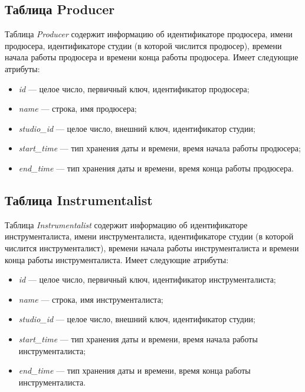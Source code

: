 \subsection{Таблица Producer}
Таблица \textit{Producer} содержит информацию об идентификаторе продюсера, имени продюсера, идентификаторе студии (в которой числится продюсер), времени начала работы продюсера и времени конца работы продюсера.
Имеет следующие атрибуты:
\begin{itemize}
	\item \textit{id} --- целое число, первичный ключ, идентификатор продюсера;
	\item \textit{name} --- строка, имя продюсера;
	\item \textit{studio\_id} --- целое число, внешний ключ, идентификатор студии;
	\item \textit{start\_time} --- тип хранения даты и времени, время начала работы продюсера;
	\item \textit{end\_time} --- тип хранения даты и времени, время конца работы продюсера.
\end{itemize}
\subsection{Таблица Instrumentalist}
Таблица \textit{Instrumentalist} содержит информацию об идентификаторе инструменталиста, имени инструменталиста, идентификаторе студии (в которой числится инструменталист), времени начала работы инструменталиста и времени конца работы инструменталиста.
Имеет следующие атрибуты:
\begin{itemize}
	\item \textit{id} --- целое число, первичный ключ, идентификатор инструменталиста;
	\item \textit{name} --- строка, имя инструменталиста;
	\item \textit{studio\_id} --- целое число, внешний ключ, идентификатор студии;
	\item \textit{start\_time} --- тип хранения даты и времени, время начала работы инструменталиста;
	\item \textit{end\_time} --- тип хранения даты и времени, время конца работы инструменталиста.
\end{itemize}


